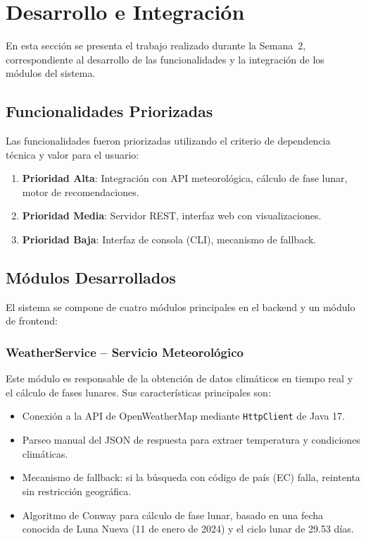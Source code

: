 \documentclass[conference]{IEEEtran}
\begin{document}
\section{Desarrollo e Integración}

En esta sección se presenta el trabajo realizado durante la Semana~2, correspondiente al desarrollo de las funcionalidades y la integración de los módulos del sistema.

\subsection{Funcionalidades Priorizadas}

Las funcionalidades fueron priorizadas utilizando el criterio de dependencia técnica y valor para el usuario:

\begin{enumerate}
    \item \textbf{Prioridad Alta}: Integración con API meteorológica, cálculo de fase lunar, motor de recomendaciones.
    \item \textbf{Prioridad Media}: Servidor REST, interfaz web con visualizaciones.
    \item \textbf{Prioridad Baja}: Interfaz de consola (CLI), mecanismo de fallback.
\end{enumerate}

\subsection{Módulos Desarrollados}

El sistema se compone de cuatro módulos principales en el backend y un módulo de frontend:

\subsubsection{WeatherService -- Servicio Meteorológico}

Este módulo es responsable de la obtención de datos climáticos en tiempo real y el cálculo de fases lunares. Sus características principales son:

\begin{itemize}
    \item Conexión a la API de OpenWeatherMap mediante \texttt{HttpClient} de Java 17.
    \item Parseo manual del JSON de respuesta para extraer temperatura y condiciones climáticas.
    \item Mecanismo de fallback: si la búsqueda con código de país (EC) falla, reintenta sin restricción geográfica.
    \item Algoritmo de Conway para cálculo de fase lunar, basado en una fecha conocida de Luna Nueva (11 de enero de 2024) y el ciclo lunar de 29.53 días.
\end{itemize}
\end{document}
